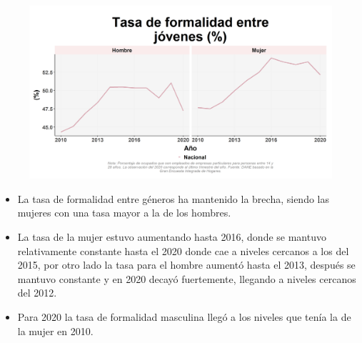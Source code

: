     \begin{figure}[H]
        \caption[Tasa de formalidad entre jóvenes por género ]{\label{formaljov_gen_trend} }
        \begin{center}
        \includegraphics[width=\textwidth,keepaspectratio]{img/var_65_trend.png}
        \end{center}
    \end{figure}
            \begin{itemize}
                \item La tasa de formalidad entre géneros ha mantenido la brecha, siendo las mujeres con una tasa mayor a la de los hombres.
                \item La tasa de la mujer estuvo aumentando hasta 2016, donde se mantuvo relativamente constante hasta el 2020 donde cae a niveles cercanos a los del 2015, por otro lado la tasa para el hombre aumentó hasta el 2013, después se mantuvo constante y en 2020 decayó fuertemente, llegando a niveles cercanos del 2012.
                \item Para 2020 la tasa de formalidad masculina llegó a los niveles que tenía la de la mujer en 2010.
                \end{itemize}

